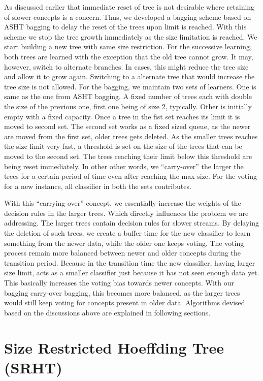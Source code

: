 As discussed earlier that immediate reset of tree is not desirable where retaining of slower concepts is a concern. Thus, we developed a bagging scheme based on ASHT bagging to delay the reset of the trees upon limit is reached. With this scheme we stop the tree growth immediately as the size limitation is reached. We start building a new tree with same size restriction. For the successive learning, both trees are learned with the exception that the old tree cannot grow. It may, however, switch to alternate branches. In cases, this might reduce the tree size and allow it to grow again. Switching to a alternate tree that would increase the tree size is not allowed. For the bagging, we maintain two sets of learners. One is same as the one from ASHT bagging. A fixed number of trees each with double the size of the previous one, first one being of size 2, typically. Other is initially empty with a fixed capacity. Once a tree in the fist set reaches its limit it is moved to second set. The second set works as a fixed sized queue, as the newer are moved from the first set, older trees gets deleted. As the smaller trees reaches the size limit very fast, a threshold is set on the size of the trees that can be moved to the second set. The trees reaching their limit below this threshold are being reset immediately. In other other words, we ``carry-over'' the larger the trees for a certain period of time even after reaching the max size. For the voting for a new instance, all classifier in both the sets contributes.

With this ``carrying-over'' concept, we essentially increase the weights of the decision rules in the larger trees. Which directly influences the problem we are addressing. The larger trees contain decision rules for slower streams. By delaying the deletion of such trees, we create a buffer time for the new classifier to learn something from the newer data, while the older one keeps voting. The voting process remain more balanced between newer and older concepts during the transition period. Because in the transition time the new classifier, having larger size limit, acts as a smaller classifier just because it has not seen enough data yet. This basically increases the voting bias towards newer concepts. With our bagging carry-over bagging, this becomes more balanced, as the larger trees would still keep voting for concepts present in older data. Algorithms devised based on the discussions above are explained in following sections.

\section{Size Restricted Hoeffding Tree (SRHT)}

